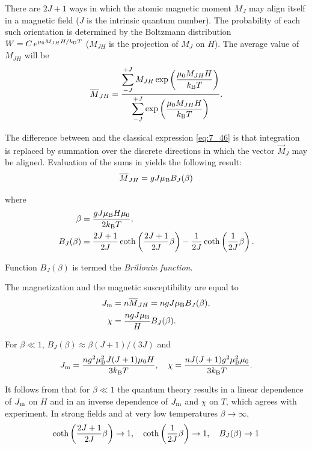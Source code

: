 There are $2J+1$ ways in which the atomic magnetic moment $M_J$ may align itself in a magnetic field ($J$ is the intrinsic quantum number). The probability of each such orientation is determined
by the Boltzmann distribution $W=C\,e^{\mu_0M_{JH}H/k_{\text{B}}T}$ ($M_{JH}$ is the projection of $M_J$ on $H$). The average value of $M_{JH}$ will be
\begin{equation}\label{eq:7_53}
    \overline{M}_{JH} = \frac{\displaystyle\sum_{-J}^{+J} M_{JH} \exp\left(\dfrac{\mu_0 M_{JH} H}{k_{\text{B}} T}\right)}{\displaystyle\sum_{-J}^{+J} \exp\left(\dfrac{\mu_0 M_{JH} H}{k_{\text{B}} T}\right)}.
\end{equation}

The difference between  and the classical expression \eqref{eq:7_46} is that integration is replaced by summation over the discrete directions in which the vector $\vec{M}_J$ may be aligned. Evaluation of the sums in  yields the following result:
\begin{equation}\label{eq:7_54}
    \overline{M}_{JH} = g J \mu_{\text{B}} B_J(\beta)
\end{equation}

\noindent
where
\begin{align}
    \beta &= \frac{g J \mu_{\text{B}} H \mu_0}{2 k_{\text{B}} T}, \label{eq:7_55}\\
    B_J(\beta) &= \frac{2J+1}{2J} \coth\left(\frac{2J+1}{2J} \beta\right) - \frac{1}{2J} \coth\left(\frac{1}{2J}\beta\right). \label{eq:7_56}
\end{align}

\noindent
Function $B_J(\beta)$ is termed the \textit{Brillouin function}.

The magnetization and the magnetic susceptibility are equal to
\begin{align}
    J_{\text{m}} &= n \overline{M}_{JH} = n g J \mu_{\text{B}} B_J(\beta), \label{eq:7_57}\\
    \chi &= \frac{n g J \mu_{\text{B}}}{H} B_J(\beta). \label{eq:7_58}
\end{align}

For $\beta\ll 1$, $B_J(\beta)\approx\beta(J+1)/(3J)$ and
\begin{equation}\label{eq:7_59}
    J_{\text{m}} = \frac{n g^2 \mu_{\text{B}}^2 J(J+1) \mu_0 H}{3 k_{\text{B}} T}, \quad \chi = \frac{n J (J+1) g^2 \mu_{\text{B}}^2 \mu_0}{3 k_{\text{B}} T}.
\end{equation}

It follows from  that for $\beta\ll 1$ the quantum theory results in a linear dependence of $J_{\text{m}}$ on $H$ and in an inverse dependence of $J_{\text{m}}$ and $\chi$ on $T$, which agrees with experiment. In strong fields and at very low temperatures $\beta\to\infty$,
\begin{equation*}
    \coth\left(\frac{2J+1}{2J} \beta\right) \to 1,\quad \coth\left(\frac{1}{2J}\beta\right) \to 1,\quad B_J(\beta) \to 1
\end{equation*}

